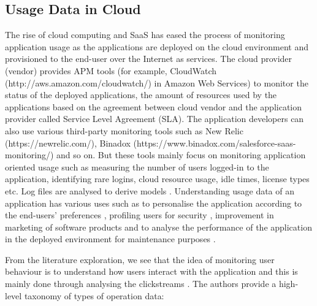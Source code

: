 \documentclass[a4paper,twoside]{article}
\begin{document}
\subsection{Usage Data in Cloud}
\label{subsec:2.2 Usage Data in Cloud}

\noindent The rise of cloud computing and SaaS has eased the process of monitoring application usage as the applications are deployed on the cloud environment and provisioned to the end-user over the Internet as services. The cloud provider (vendor) provides APM tools (for example, CloudWatch (http://aws.amazon.com/cloudwatch/) in Amazon Web Services) to monitor the status of the deployed applications, the amount of resources used by the applications based on the agreement between cloud vendor and the application provider called Service Level Agreement (SLA). The application developers can also use various third-party monitoring tools such as New Relic (https://newrelic.com/), Binadox (https://www.binadox.com/salesforce-saas-monitoring/) and so on. But these tools mainly focus on monitoring application oriented usage such as measuring the number of users logged-in to the application, identifying rare logins, cloud resource usage, idle times, license types etc. Log files are analysed to derive models \cite{Petruch2012DerivingSimulations}. Understanding usage data of an application has various uses such as to personalise the application according to the end-users’ preferences \cite{Yang2017MultimediaPlatform}, profiling users for security \cite{Al-Bayati2016AdaptiveAnalysis}, improvement in marketing of software products \cite{Bucklin2009ClickMarketing} and to analyse the performance of the application in the deployed environment for maintenance purposes \cite{Petruch2012DerivingSimulations,Zaidman2010Multi-TenantPaper}.

From the literature exploration, we see that the idea of monitoring user behaviour is to understand how users interact with the application and this is mainly done through analysing the clickstreams \cite{Pachidi2014UnderstandingMining,Wang2016UnsupervisedAnalysis,Banerjee2001ClickstreamSubsequences,Bucklin2009ClickMarketing}. The authors \cite{Cito2015RuntimeFeedback} provide a high-level taxonomy of types of operation data: 
\end{document}
